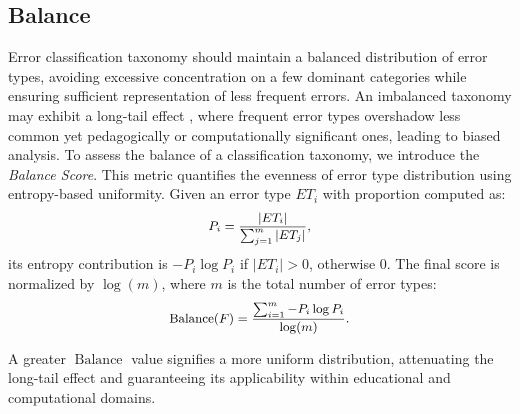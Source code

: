 \subsection{Balance}
Error classification taxonomy should maintain a balanced distribution of error types, avoiding excessive concentration on a few dominant categories while ensuring sufficient representation of less frequent errors. An imbalanced taxonomy may exhibit a long-tail effect \citep{lt1,lt2}, where frequent error types overshadow less common yet pedagogically or computationally significant ones, leading to biased analysis. To assess the balance of a classification taxonomy, we introduce the \textit{Balance Score}. This metric quantifies the evenness of error type distribution using entropy-based uniformity. Given an error type $ET_i$ with proportion computed as:
\begin{equation}\begin{small}\begin{aligned}
    P_i=\frac{|ET_i|}{\sum_{j=1}^m|ET_j|},
\end{aligned}\end{small}\end{equation}
\noindent its entropy contribution is $-P_i \log P_i$ if $|ET_i|>0$, otherwise 0. The final score is normalized by $\log(m)$, where $m$ is the total number of error types:
\begin{equation}\begin{small}\begin{aligned}
\operatorname{Balance}(F)=\frac{\sum_{i=1}^m -P_i \log P_i}{\log (m)}.
\end{aligned}\end{small}\end{equation}

A greater $\operatorname{Balance}$ value signifies a more uniform distribution, attenuating the long-tail effect and guaranteeing its applicability within educational and computational domains.



